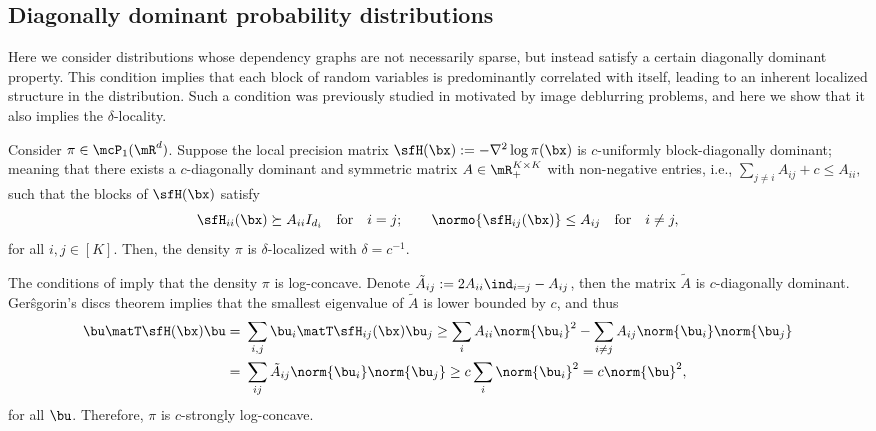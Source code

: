 \documentclass[11pt]{article}
\begin{document}
\subsection{Diagonally dominant probability distributions}
\label{sec:diag_dom}

Here we consider distributions whose dependency graphs are not necessarily sparse, but instead satisfy a certain diagonally dominant property.
This condition implies that each block of random variables is predominantly correlated with itself, leading to an inherent localized structure in the distribution.
Such a condition was previously studied in \cite{24M1694781} motivated by image deblurring problems, and here we show that it also implies the $\delta$-locality. 


\begin{thm}
\label{thm:diag_loc}
Consider $\pi\in \mcP_1(\mR^d)$. Suppose the local precision matrix $\sfH(\bx) := - \nabla^2 \log \pi(\bx)$ is $c$-uniformly block-diagonally dominant; meaning that there exists a $c$-diagonally dominant and symmetric matrix $A \in\mR_+^{K\times K}$ with non-negative entries, i.e.,
\(
 \sum_{j\neq i} A_{ij} + c \le A_{ii},
\)
such that the blocks of $\sfH(\bx)$ satisfy
\begin{equation}
    \sfH_{ii}(\bx) \succeq A_{ii} I_{d_i} \quad \text{for} \quad i= j; \qquad \normo{ \sfH_{ij}(\bx) } \le A_{ij} \quad \text{for} \quad i\neq j,
\end{equation}
for all $i,j \in [K]$. Then, the density $\pi$ is $\delta$-localized with $\delta = c^{-1}$. 
\end{thm} 


\begin{rem}
\label{rem:l_cond}
The conditions of  imply that the density $\pi$ is log-concave. Denote $\tilde{A}_{ij}:= 2 A_{ii} \ind_{i=j} - A_{ij}$, then the matrix $\tilde{A}$ is $c$-diagonally dominant. Ger\^sgorin's discs theorem \cite{MR2978290} implies that the smallest eigenvalue of $\tilde{A}$ is lower bounded by $c$, and thus 
\begin{equation}
\begin{split}
    \bu\matT \sfH(\bx) \bu =~& \sum_{i,j} \bu_i\matT \sfH_{ij}(\bx) \bu_j \ge \sum_i A_{ii} \norm{\bu_i}^2 - \sum_{i\neq j} A_{ij} \norm{\bu_i} \norm{\bu_j} \\
    =~& \sum_{ij} \tilde{A}_{ij} \norm{\bu_i} \norm{\bu_j} \ge c \sum_{i} \norm{\bu_i}^2 = c \norm{\bu}^2,
\end{split}
\end{equation}
for all $\bu$. Therefore, $\pi$ is $c$-strongly log-concave. 
\end{rem}
\end{document}
